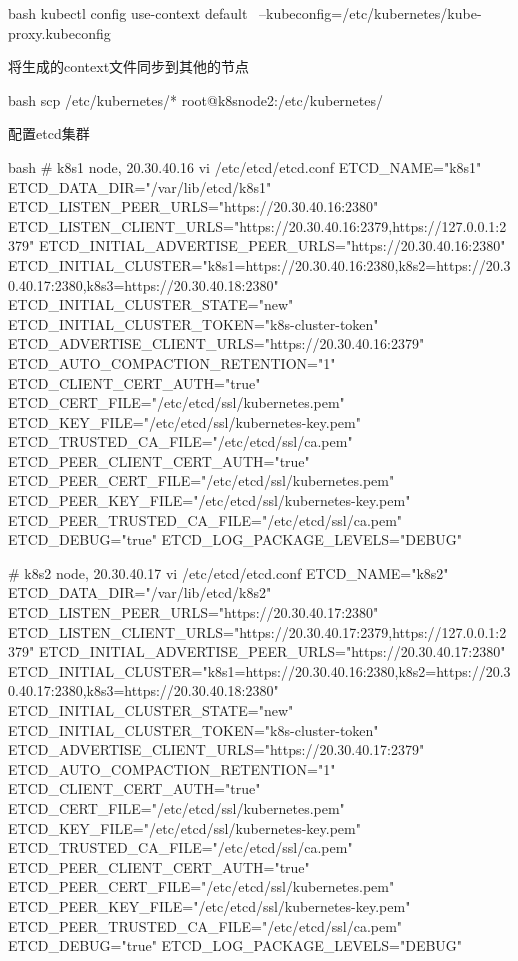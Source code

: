 \begin{outline}[enumerate]
\begin{code-in-enumerate}{bash}
kubectl config use-context default \
        --kubeconfig=/etc/kubernetes/kube-proxy.kubeconfig
\end{code-in-enumerate}
将生成的context文件同步到其他的节点
\begin{code-in-enumerate}{bash}
scp /etc/kubernetes/* root@k8snode2:/etc/kubernetes/
\end{code-in-enumerate}

  \1 配置etcd集群
\begin{code-in-enumerate}{bash}
# k8s1 node, 20.30.40.16
vi /etc/etcd/etcd.conf
ETCD_NAME="k8s1"
ETCD_DATA_DIR="/var/lib/etcd/k8s1"
ETCD_LISTEN_PEER_URLS="https://20.30.40.16:2380"
ETCD_LISTEN_CLIENT_URLS="https://20.30.40.16:2379,https://127.0.0.1:2379"
ETCD_INITIAL_ADVERTISE_PEER_URLS="https://20.30.40.16:2380"
ETCD_INITIAL_CLUSTER="k8s1=https://20.30.40.16:2380,k8s2=https://20.30.40.17:2380,k8s3=https://20.30.40.18:2380"
ETCD_INITIAL_CLUSTER_STATE="new"
ETCD_INITIAL_CLUSTER_TOKEN="k8s-cluster-token"
ETCD_ADVERTISE_CLIENT_URLS="https://20.30.40.16:2379"
ETCD_AUTO_COMPACTION_RETENTION="1"
ETCD_CLIENT_CERT_AUTH="true"
ETCD_CERT_FILE="/etc/etcd/ssl/kubernetes.pem"
ETCD_KEY_FILE="/etc/etcd/ssl/kubernetes-key.pem"
ETCD_TRUSTED_CA_FILE="/etc/etcd/ssl/ca.pem"
ETCD_PEER_CLIENT_CERT_AUTH="true"
ETCD_PEER_CERT_FILE="/etc/etcd/ssl/kubernetes.pem"
ETCD_PEER_KEY_FILE="/etc/etcd/ssl/kubernetes-key.pem"
ETCD_PEER_TRUSTED_CA_FILE="/etc/etcd/ssl/ca.pem"
ETCD_DEBUG="true"
ETCD_LOG_PACKAGE_LEVELS="DEBUG"

# k8s2 node, 20.30.40.17
vi /etc/etcd/etcd.conf
ETCD_NAME="k8s2"
ETCD_DATA_DIR="/var/lib/etcd/k8s2"
ETCD_LISTEN_PEER_URLS="https://20.30.40.17:2380"
ETCD_LISTEN_CLIENT_URLS="https://20.30.40.17:2379,https://127.0.0.1:2379"
ETCD_INITIAL_ADVERTISE_PEER_URLS="https://20.30.40.17:2380"
ETCD_INITIAL_CLUSTER="k8s1=https://20.30.40.16:2380,k8s2=https://20.30.40.17:2380,k8s3=https://20.30.40.18:2380"
ETCD_INITIAL_CLUSTER_STATE="new"
ETCD_INITIAL_CLUSTER_TOKEN="k8s-cluster-token"
ETCD_ADVERTISE_CLIENT_URLS="https://20.30.40.17:2379"
ETCD_AUTO_COMPACTION_RETENTION="1"
ETCD_CLIENT_CERT_AUTH="true"
ETCD_CERT_FILE="/etc/etcd/ssl/kubernetes.pem"
ETCD_KEY_FILE="/etc/etcd/ssl/kubernetes-key.pem"
ETCD_TRUSTED_CA_FILE="/etc/etcd/ssl/ca.pem"
ETCD_PEER_CLIENT_CERT_AUTH="true"
ETCD_PEER_CERT_FILE="/etc/etcd/ssl/kubernetes.pem"
ETCD_PEER_KEY_FILE="/etc/etcd/ssl/kubernetes-key.pem"
ETCD_PEER_TRUSTED_CA_FILE="/etc/etcd/ssl/ca.pem"
ETCD_DEBUG="true"
ETCD_LOG_PACKAGE_LEVELS="DEBUG"


\end{code-in-enumerate}
\end{outline}
